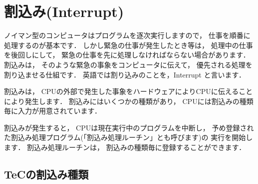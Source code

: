 \vfill
\begin{center}
\end{center}

\newpage
\section{割込み(Interrupt)}

ノイマン型のコンピュータはプログラムを逐次実行しますので，
仕事を順番に処理するのが基本です．
しかし緊急の仕事が発生したとき等は，
処理中の仕事を後回しにして，
緊急の仕事を先に処理しなければならない場合があります．
割込みは，
そのような緊急の事象をコンピュータに伝えて，
優先される処理を割り込ませる仕組です．
英語では割り込みのことを，Interrupt と言います．

割込みは，
CPUの外部で発生した事象をハードウェアによりCPUに伝えることにより発生します．
割込みにはいくつかの種類があり，
CPUには割込みの種類毎に入力が用意されています．

割込みが発生すると，
CPUは現在実行中のプログラムを中断し，
予め登録された割込み処理プログラム(「割込み処理ルーチン」とも呼びます)の
実行を開始します．
割込み処理ルーチンは，
割込みの種類毎に登録することができます．

\begin{center}
\epsfxsize=4.5cm
\end{center}

\subsection{TeCの割込み種類}


